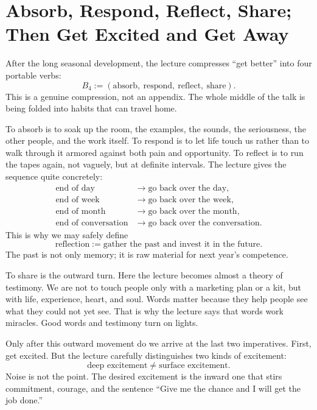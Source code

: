 \section{Absorb, Respond, Reflect, Share; Then Get Excited and Get Away}

After the long seasonal development, the lecture compresses ``get better'' into four portable verbs:
\begin{equation}
B_4 := (\text{absorb},\ \text{respond},\ \text{reflect},\ \text{share}).
\end{equation}
This is a genuine compression, not an appendix. The whole middle of the talk is being folded into habits that can travel home.

To absorb is to soak up the room, the examples, the sounds, the seriousness, the other people, and the work itself. To respond is to let life touch us rather than to walk through it armored against both pain and opportunity. To reflect is to run the tapes again, not vaguely, but at definite intervals. The lecture gives the sequence quite concretely:
\begin{align}
\text{end of day} &\to \text{go back over the day},\\
\text{end of week} &\to \text{go back over the week},\\
\text{end of month} &\to \text{go back over the month},\\
\text{end of conversation} &\to \text{go back over the conversation}.
\end{align}
This is why we may safely define
\begin{equation}
\text{reflection} := \text{gather the past and invest it in the future}.
\end{equation}
The past is not only memory; it is raw material for next year's competence.

To share is the outward turn. Here the lecture becomes almost a theory of testimony. We are not to touch people only with a marketing plan or a kit, but with life, experience, heart, and soul. Words matter because they help people see what they could not yet see. That is why the lecture says that words work miracles. Good words and testimony turn on lights.

Only after this outward movement do we arrive at the last two imperatives. First, get excited. But the lecture carefully distinguishes two kinds of excitement:
\begin{equation}
\text{deep excitement} \neq \text{surface excitement}.
\end{equation}
Noise is not the point. The desired excitement is the inward one that stirs commitment, courage, and the sentence ``Give me the chance and I will get the job done.''

